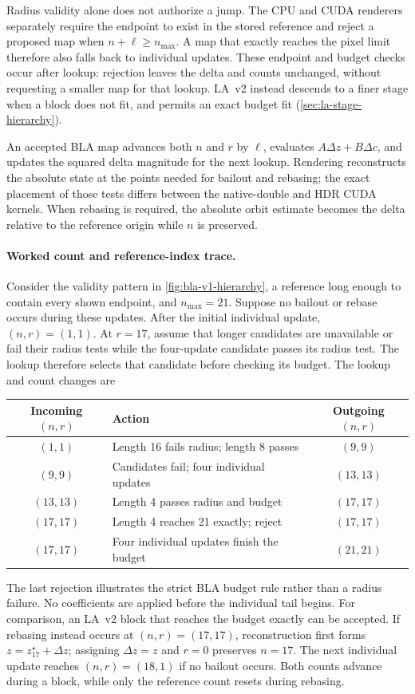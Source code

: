 Radius validity alone does not authorize a jump. The CPU and CUDA
renderers separately require the endpoint to exist in the stored
reference and reject a proposed map when $n+\ell\ge n_{\max}$.
A map that exactly reaches the pixel limit therefore also falls back
to individual updates. These endpoint and budget checks occur after
lookup: rejection leaves the delta and counts unchanged, without
requesting a smaller map for that lookup. LA~v2 instead descends to a
finer stage when a block does not fit, and permits an exact budget fit
(\cref{sec:la-stage-hierarchy}).

An accepted BLA map advances both $n$ and $r$ by $\ell$, evaluates
$A\Delta z+B\Delta c$, and updates the squared delta magnitude for
the next lookup. Rendering reconstructs the absolute state at the
points needed for bailout and rebasing; the exact placement of those
tests differs between the native-double and HDR CUDA kernels. When
rebasing is required, the absolute orbit estimate becomes the delta
relative to the reference origin while $n$ is preserved.

\paragraph{Worked count and reference-index trace.}
Consider the validity pattern in \cref{fig:bla-v1-hierarchy}, a reference long
enough to contain every shown endpoint, and $n_{\max}=21$. Suppose no bailout or
rebase occurs during these updates. After the initial individual update,
$(n,r)=(1,1)$. At $r=17$, assume that longer candidates are unavailable or fail
their radius tests while the four-update candidate passes its radius test.
The lookup therefore selects that candidate before checking its budget. The
lookup and count changes are
\begin{center}
\begin{tabular}{clc}
\hline
Incoming $(n,r)$ & Action & Outgoing $(n,r)$\\
\hline
$(1,1)$ & Length 16 fails radius; length 8 passes & $(9,9)$\\
$(9,9)$ & Candidates fail; four individual updates & $(13,13)$\\
$(13,13)$ & Length 4 passes radius and budget & $(17,17)$\\
$(17,17)$ & Length 4 reaches 21 exactly; reject & $(17,17)$\\
$(17,17)$ & Four individual updates finish the budget & $(21,21)$\\
\hline
\end{tabular}
\end{center}
The last rejection illustrates the strict BLA budget rule rather than a radius
failure. No coefficients are applied before the individual tail begins. For
comparison, an LA~v2 block that reaches the budget exactly can be accepted.
If rebasing instead occurs at $(n,r)=(17,17)$, reconstruction first forms
$z=z_{17}^\star+\Delta z$; assigning $\Delta z=z$ and $r=0$ preserves $n=17$.
The next individual update reaches $(n,r)=(18,1)$ if no bailout occurs.
Both counts advance during a block, while only the reference count resets
during rebasing.

